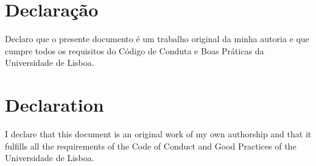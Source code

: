 %

\thispagestyle{empty}

\section*{Declara\c{c}\~{a}o} %
{\large

Declaro que o presente documento \'{e} um trabalho original da minha autoria e que cumpre todos
os requisitos do C\'{o}digo de Conduta e Boas Pr\'{a}ticas da Universidade de Lisboa.
}

\section*{Declaration} %
{\large

I declare that this document is an original work of my own authorship and that it fulfills all the
requirements of the Code of Conduct and Good Practices of the Universidade de Lisboa.
}

\vfill

\cleardoublepage